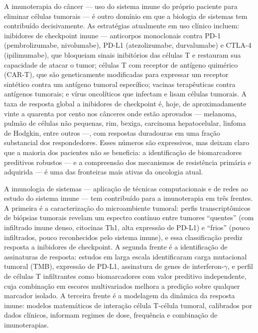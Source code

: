 A imunoterapia do câncer --- uso do sistema imune do próprio paciente para eliminar células tumorais --- é outro domínio em que a biologia de sistemas tem contribuído decisivamente. As estratégias atualmente em uso clínico incluem: inibidores de checkpoint imune --- anticorpos monoclonais contra PD-1 (pembrolizumabe, nivolumabe), PD-L1 (atezolizumabe, durvalumabe) e CTLA-4 (ipilimumabe), que bloqueiam sinais inibitórios das células T e restauram sua capacidade de atacar o tumor; células T com receptor de antígeno quimérico (CAR-T), que são geneticamente modificadas para expressar um receptor sintético contra um antígeno tumoral específico; vacinas terapêuticas contra antígenos tumorais; e vírus oncolíticos que infectam e lisam células tumorais. A taxa de resposta global a inibidores de checkpoint é, hoje, de aproximadamente vinte a quarenta por cento nos cânceres onde estão aprovados --- melanoma, pulmão de células não pequenas, rim, bexiga, carcinoma hepatocelular, linfoma de Hodgkin, entre outros ---, com respostas duradouras em uma fração substancial dos respondedores. Esses números são expressivos, mas deixam claro que a maioria dos pacientes não se beneficia: a identificação de biomarcadores preditivos robustos --- e a compreensão dos mecanismos de resistência primária e adquirida --- é uma das fronteiras mais ativas da oncologia atual.

A imunologia de sistemas --- aplicação de técnicas computacionais e de redes ao estudo do sistema imune --- tem contribuído para a imunoterapia em três frentes. A primeira é a caracterização do microambiente tumoral: perfis transcriptômicos de biópsias tumorais revelam um espectro contínuo entre tumores ``quentes'' (com infiltrado imune denso, citocinas Th1, alta expressão de PD-L1) e ``frios'' (pouco infiltrados, pouco reconhecidos pelo sistema imune), e essa classificação prediz resposta a inibidores de checkpoint. A segunda frente é a identificação de assinaturas de resposta: estudos em larga escala identificaram carga mutacional tumoral (TMB), expressão de PD-L1, assinatura de genes de interferon-$\gamma$, e perfil de células T infiltrantes como biomarcadores com valor preditivo independente, cuja combinação em escores multivariados melhora a predição sobre qualquer marcador isolado. A terceira frente é a modelagem da dinâmica da resposta imune: modelos matemáticos de interação célula T-célula tumoral, calibrados por dados clínicos, informam regimes de dose, frequência e combinação de imunoterapias.

